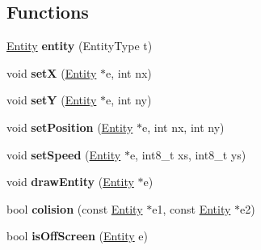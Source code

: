 \subsection*{Functions}
\begin{DoxyCompactItemize}
\item 
\mbox{\label{group__Entity_gabd866462d1cf1c15cb21f4574bc4cfe8}} 
\hyperlink{structentity__t}{Entity} {\bfseries entity} (Entity\+Type t)
\item 
\mbox{\label{group__Entity_ga9507e3ef478bf1f94be1cfec14a882a6}} 
void {\bfseries setX} (\hyperlink{structentity__t}{Entity} $\ast$e, int nx)
\item 
\mbox{\label{group__Entity_gaf3d120610bb1bca9494d115375ad2bdb}} 
void {\bfseries setY} (\hyperlink{structentity__t}{Entity} $\ast$e, int ny)
\item 
\mbox{\label{group__Entity_gad22faaa5659be76769c4b164262db848}} 
void {\bfseries set\+Position} (\hyperlink{structentity__t}{Entity} $\ast$e, int nx, int ny)
\item 
\mbox{\label{group__Entity_gaa09a9bc2a93955f3c7c228a7cff79038}} 
void {\bfseries set\+Speed} (\hyperlink{structentity__t}{Entity} $\ast$e, int8\+\_\+t xs, int8\+\_\+t ys)
\item 
\mbox{\label{group__Entity_ga63cd51b06338622306ddbe55087ac04f}} 
void {\bfseries draw\+Entity} (\hyperlink{structentity__t}{Entity} $\ast$e)
\item 
\mbox{\label{group__Entity_ga150fb147dbe3e8e338605c60a87cad52}} 
bool {\bfseries colision} (const \hyperlink{structentity__t}{Entity} $\ast$e1, const \hyperlink{structentity__t}{Entity} $\ast$e2)
\item 
\mbox{\label{group__Entity_gafa4042538d842ec482d954276ac8cf41}} 
bool {\bfseries is\+Off\+Screen} (\hyperlink{structentity__t}{Entity} e)
\end{DoxyCompactItemize}

